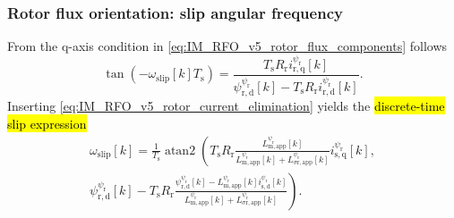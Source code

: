 \begin{frame}
    \frametitle{Rotor flux orientation: slip angular frequency}
    From the $\mathrm{q}$-axis condition in \eqref{eq:IM_RFO_v5_rotor_flux_components} follows
    \begin{equation}
        \tan(-\omega_\mathrm{slip}[k]T_\mathrm{s})
        =\frac{T_\mathrm{s}R_\mathrm{r}i^{\psi_\mathrm{r}}_{\mathrm{r,q}}[k]}
        {\psi^{\psi_\mathrm{r}}_{\mathrm{r,d}}[k]-T_\mathrm{s}R_\mathrm{r}i^{\psi_\mathrm{r}}_{\mathrm{r,d}}[k]}.
        \label{eq:IM_RFO_v5_slip_before_elimination}
    \end{equation}\pause%
    Inserting \eqref{eq:IM_RFO_v5_rotor_current_elimination} yields the \hl{discrete-time slip expression}
    \begin{equation}
        \begin{split}
            \omega_\mathrm{slip}[k]
            =\frac{1}{T_\mathrm{s}}\operatorname{atan2}\left(
            T_\mathrm{s}R_\mathrm{r}\frac{L^{\psi_\mathrm{r}}_{\mathrm{m,app}}[k]}
                                    {L^{\psi_\mathrm{r}}_{\mathrm{m,app}}[k]+L^{\psi_\mathrm{r}}_{\sigma\mathrm{r,app}}[k]}
            i^{\psi_\mathrm{r}}_{\mathrm{s,q}}[k], \right. \\
            \left.
            \psi^{\psi_\mathrm{r}}_{\mathrm{r,d}}[k]
            -T_\mathrm{s}R_\mathrm{r}\frac{\psi^{\psi_\mathrm{r}}_{\mathrm{r,d}}[k]
                                         -L^{\psi_\mathrm{r}}_{\mathrm{m,app}}[k]i^{\psi_\mathrm{r}}_{\mathrm{s,d}}[k]}
                                     {L^{\psi_\mathrm{r}}_{\mathrm{m,app}}[k]+L^{\psi_\mathrm{r}}_{\sigma\mathrm{r,app}}[k]}
            \right).
            \label{eq:IM_RFO_v5_slip_after_elimination}
        \end{split}
    \end{equation}
\end{frame}

